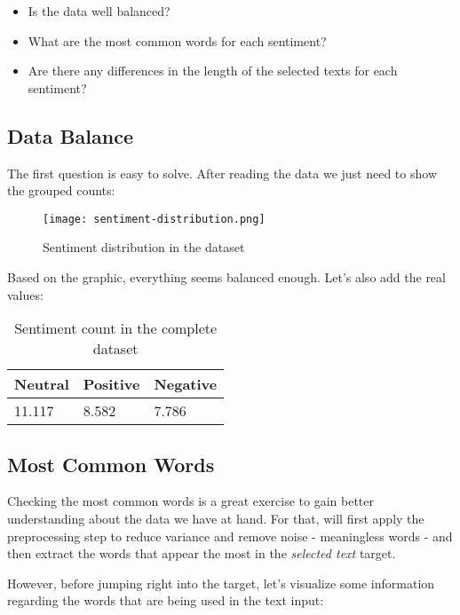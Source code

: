 \documentclass[11pt]{article}
\begin{document}
\begin{itemize}
    \item Is the data well balanced?
    \item What are the most common words for each sentiment?
    \item Are there any differences in the length of the selected texts for each sentiment?
\end{itemize}

\subsection{Data Balance}

The first question is easy to solve. After reading the data we just need to show the grouped counts:


\begin{figure}[h]
\centering
\texttt{[image: sentiment-distribution.png]}
\caption{Sentiment distribution in the dataset}
\end{figure}


Based on the graphic, everything seems balanced enough. Let's also add the real values:

\begin{table}[h]
\centering
\begin{tabular}{l|l|l}
\hline
\hline
Neutral & Positive & Negative \\ \hline
11.117 & 8.582 & 7.786 \\ 
\hline
\hline
\end{tabular}
\caption{Sentiment count in the complete dataset}
\end{table}

\subsection{Most Common Words}

Checking the most common words is a great exercise to gain better understanding about the data we have at hand. For that, will first apply the preprocessing step to reduce variance and remove noise - meaningless words - and then extract the words that appear the most in the \textit{selected text} target.

However, before jumping right into the target, let's visualize some information regarding the words that are being used in the text input:
\end{document}
